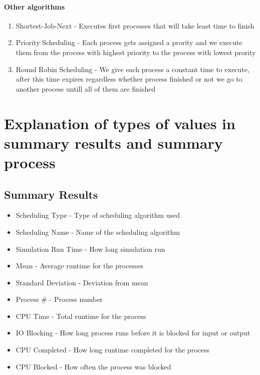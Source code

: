 \documentclass{article}
\begin{document}
\paragraph{Other algorithms} \cite{Other scheduling algorithms}
\begin{enumerate}
	\item Shortest-Job-Next - Executes first processes that will take least
		time to finish
	\item Priority Scheduling - Each process gets assigned a prority and we
		execute them from the process with highest priority to the
		process with lowest prority
	\item Round Robin Scheduling - We give each process a constant time to
		execute, after this time expires regardless whether process
		finished or not we go to another process untill all of them are
		finished
\end{enumerate}
\section{Explanation of types of values in summary results and summary
process} 
\subsection{Summary Results} 
\begin{itemize}
	\item Scheduling Type - Type of scheduling algorithm used
	\item Scheduling Name - Name of the scheduling algorithm
	\item Simulation Run Time - How long simulation run
	\item Mean - Average runtime for the processes
	\item Standard Deviation - Deviation from mean
	\item Process \#    - Process number
	\item CPU Time      - Total runtime for the process
	\item IO Blocking   - How long process runs before it is blocked for
		input or output
	\item CPU Completed - How long runtime completed for the process
	\item CPU Blocked   - How often the process was blocked
\end{itemize}
\cite{lab3 Manual}
\end{document}
